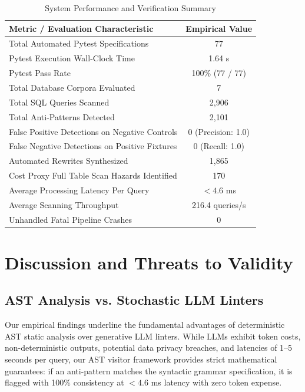 \documentclass[conference]{IEEEtran}
\begin{document}
\begin{table}[t]
\caption{System Performance and Verification Summary}
\label{tab:system_summary}
\centering
\begin{tabular}{lc}
\toprule
\textbf{Metric / Evaluation Characteristic} & \textbf{Empirical Value} \\
\midrule
Total Automated Pytest Specifications & 77 \\
Pytest Execution Wall-Clock Time & 1.64 s \\
Pytest Pass Rate & 100\% (77 / 77) \\
Total Database Corpora Evaluated & 7 \\
Total SQL Queries Scanned & 2,906 \\
Total Anti-Patterns Detected & 2,101 \\
False Positive Detections on Negative Controls & 0 (Precision: 1.0) \\
False Negative Detections on Positive Fixtures & 0 (Recall: 1.0) \\
Automated Rewrites Synthesized & 1,865 \\
Cost Proxy Full Table Scan Hazards Identified & 170 \\
Average Processing Latency Per Query & $<4.6$ ms \\
Average Scanning Throughput & 216.4 queries/s \\
Unhandled Fatal Pipeline Crashes & 0 \\
\bottomrule
\end{tabular}
\end{table}

\section{Discussion and Threats to Validity}

\subsection{AST Analysis vs. Stochastic LLM Linters}
Our empirical findings underline the fundamental advantages of deterministic AST static analysis over generative LLM linters. While LLMs exhibit token costs, non-deterministic outputs, potential data privacy breaches, and latencies of 1--5 seconds per query, our AST visitor framework provides strict mathematical guarantees: if an anti-pattern matches the syntactic grammar specification, it is flagged with 100\% consistency at $<4.6$ ms latency with zero token expense.
\end{document}
